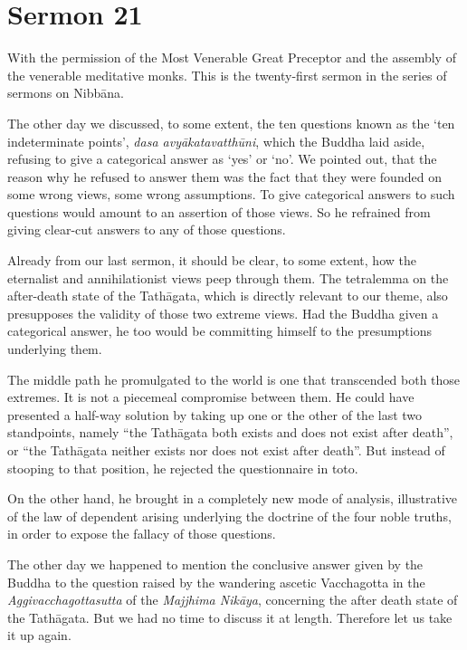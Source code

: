 \chapter{Sermon 21}

\NibbanaOpeningQuote

\enlargethispage{\baselineskip}

With the permission of the Most Venerable Great Preceptor and the assembly of the venerable meditative monks. This is the twenty-first sermon in the series of sermons on Nibbāna.

The other day we discussed, to some extent, the ten questions known as the `ten indeterminate points', \emph{dasa avyākatavatthūni}, which the Buddha laid aside, refusing to give a categorical answer as `yes' or `no'. We pointed out, that the reason why he refused to answer them was the fact that they were founded on some wrong views, some wrong assumptions. To give categorical answers to such questions would amount to an assertion of those views. So he refrained from giving clear-cut answers to any of those questions.

Already from our last sermon, it should be clear, to some extent, how the eternalist and annihilationist views peep through them. The tetralemma on the after-death state of the Tathāgata, which is directly relevant to our theme, also presupposes the validity of those two extreme views. Had the Buddha given a categorical answer, he too would be committing himself to the presumptions underlying them.

The middle path he promulgated to the world is one that transcended both those extremes. It is not a piecemeal compromise between them. He could have presented a half-way solution by taking up one or the other of the last two standpoints, namely ``the Tathāgata both exists and does not exist after death'', or ``the Tathāgata neither exists nor does not exist after death''. But instead of stooping to that position, he rejected the questionnaire in toto.

On the other hand, he brought in a completely new mode of analysis, illustrative of the law of dependent arising underlying the doctrine of the four noble truths, in order to expose the fallacy of those questions.

The other day we happened to mention the conclusive answer given by the Buddha to the question raised by the wandering ascetic Vacchagotta in the \emph{Aggivacchagottasutta} of the \emph{Majjhima Nikāya}, concerning the after death state of the Tathāgata. But we had no time to discuss it at length. Therefore let us take it up again.

